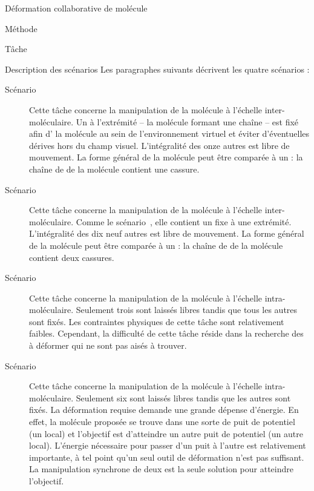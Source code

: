 \documentclass[myfrancais]{mythesis}
\begin{document}
\begin{mychapter}{Déformation collaborative de molécule}
\begin{mysection}{Méthode}
\begin{mysubsection}{Tâche}
\begin{mysubsubsection}{Description des scénarios}
					Les paragraphes suivants décrivent les quatre scénarios :
					\begin{description}
						\item[Scénario~]
							Cette tâche concerne la manipulation de la molécule \myTRPZIPPER à l'échelle inter-moléculaire.
							Un  à l'extrémité -- la molécule formant une chaîne -- est fixé afin d' la molécule au sein de l'environnement virtuel et éviter d'éventuelles dérives hors du champ visuel.
							L'intégralité des onze autres  est libre de mouvement.
							La forme général de la molécule peut être comparée à un  : la chaîne de  de la molécule contient une cassure.
						\item[Scénario~]
							Cette tâche concerne la manipulation de la molécule \myTRPCAGE à l'échelle inter-moléculaire.
							Comme le scénario~, elle contient un  fixe à une extrémité.
							L'intégralité des dix neuf autres  est libre de mouvement.
							La forme général de la molécule peut être comparée à un  : la chaîne de  de la molécule contient deux cassures.
						\item[Scénario~]
							Cette tâche concerne la manipulation de la molécule \myTRPZIPPER à l'échelle intra-moléculaire.
							Seulement trois  sont laissés libres tandis que tous les autres sont fixés.
							Les contraintes physiques de cette tâche sont relativement faibles.
							Cependant, la difficulté de cette tâche réside dans la recherche des  à déformer qui ne sont pas aisés à trouver.
						\item[Scénario~]
							Cette tâche concerne la manipulation de la molécule \myTRPCAGE à l'échelle intra-moléculaire.
							Seulement six  sont laissés libres tandis que les autres sont fixés.
							La déformation requise demande une grande dépense d'énergie.
							En effet, la molécule proposée se trouve dans une sorte de puit de potentiel (un  local) et l'objectif est d'atteindre un autre puit de potentiel (un autre  local).
							L'énergie nécessaire pour passer d'un puit à l'autre est relativement importante, à tel point qu'un seul outil de déformation n'est pas suffisant.
							La manipulation synchrone de deux  est la seule solution pour atteindre l'objectif.
					\end{description}


\end{mysubsubsection}
\end{mysubsection}
\end{mysection}
\end{mychapter}
\end{document}
